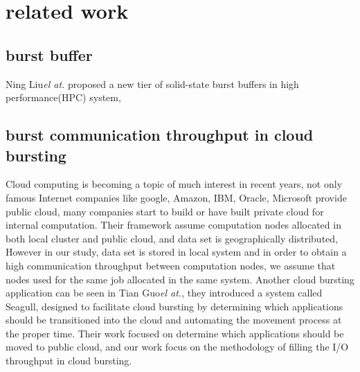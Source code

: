 \section{related work}
\label{sec:related work}

\subsection{burst buffer}
Ning Liu\emph{el at.} \cite{on_the_role_of_burst_buffers} proposed a new tier of solid-state burst
buffers in high performance(HPC) system, 

\subsection{burst communication throughput in cloud bursting}
Cloud computing is becoming a topic of much interest in recent years, not only famous Internet
companies like google, Amazon, IBM, Oracle, Microsoft provide public cloud, many companies start to
build or have built private cloud for internal computation.
Their framework assume computation nodes allocated in both local cluster and public cloud, and data
set is geographically distributed, However in our study, data set is stored in local system and in
order to obtain a high communication throughput between computation nodes, we assume that nodes
used for the same job allocated in the same system.
Another cloud bursting application can be seen in Tian Guo\emph{el at.}\cite{Seagull}, they
introduced a system called Seagull, designed to facilitate cloud bursting by determining which
applications should be transitioned into the cloud and automating the movement process at the proper
time. Their work focused on determine which applications should be moved to public cloud, and our
work focus on the methodology of filling the I/O throughput in cloud bursting.